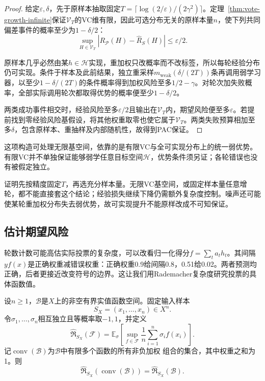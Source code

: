 \begin{proof}
给定$\varepsilon,\delta$，先于原样本抽取固定$T=\lceil\log(2/\varepsilon)/(2\gamma^2)\rceil$。定理~\ref{thm:vote-growth-infinite}保证$\mathcal V_T$的VC维有限，因此可选分布无关的原样本量$n$，使下列共同偏差事件的概率至少为$1-\delta/2$：
\[
 \sup_{H\in\mathcal V_T}|R_{\mathcal P}(H)-\hat R_S(H)|\leq\varepsilon/2.
\]

原样本几乎必然由某$h\in\mathcal H$实现，重加权只改概率而不改标签，所以每轮经验分布仍可实现。条件于样本及此前结果，独立重采样$m_{\mathrm{weak}}(\delta/(2T))$条再调用弱学习器，以至少$1-\delta/(2T)$的条件概率得到加权风险至多$1/2-\gamma$。对轮次加失败概率，全部实际调用轮次都取得优势的概率便至少$1-\delta/2$。

两类成功事件相交时，经验风险至多$\varepsilon/2$且输出在$\mathcal V_T$内，期望风险便至多$\varepsilon$。若提前找到零经验风险基假设，将其他权重取零也使它属于$\mathcal V_T$。两类失败预算相加至多$\delta$，包含原样本、重抽样及内部随机性，故得到PAC保证。
\end{proof}

这项构造可处理无限基空间，依靠的是有限VC与全可实现分布上的统一弱优势。有限VC并不单独保证能够弱学任意目标空间$\mathcal H$，优势条件须另证；各轮错误也没有被假定独立。

证明先按精度固定$T$，再选充分样本量。无限VC基空间，或固定样本量任意增轮，都不能直接套这个结论；经验损失继续下降仍需额外复杂度控制。噪声还可能使某轮重加权分布失去弱优势，故可实现提升不能原样改成不可知保证。

\subsection{估计期望风险}

轮数计数可能高估实际投票的复杂度，可以改看归一化得分$f=\sum_ta_th_t$。其间隔$yf(x)$是正确权重减错误权重：正确权重0.9给间隔0.8，0.51给0.02。两者预测均正确，后者更接近改变符号的边界。这让我们用Rademacher复杂度研究投票的具体函数值。

\begin{theorem}[凸组合的Rademacher复杂度]
\label{thm:learning-ensemble-convex-hull}
设$n\geq1$，$\mathcal B$是$X$上的非空有界实值函数空间。固定输入样本
\[
 S_X=(x_1,\ldots,x_n)\in X^n.
\]
令$\sigma_1,\ldots,\sigma_n$相互独立且等概率取$-1,1$，并定义
\[
 \widehat{\mathfrak R}_{S_X}(\mathcal F)
 =\mathbb E_\sigma\left[\sup_{f\in\mathcal F}
   \frac1n\sum_{i=1}^n\sigma_i f(x_i)\right].
\]
记$\operatorname{conv}(\mathcal B)$为$\mathcal B$中有限多个函数的所有非负加权
组合的集合，其中权重之和为1。则
\[
 \widehat{\mathfrak R}_{S_X}(\operatorname{conv}(\mathcal B))
 =\widehat{\mathfrak R}_{S_X}(\mathcal B).
\]
\end{theorem}

